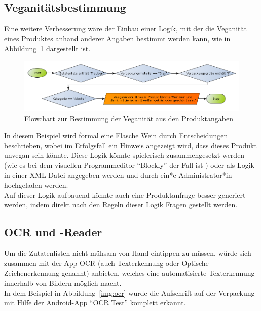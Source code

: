 \subsection{Veganitätsbestimmung}
\label{sec:future_work:veganity}

Eine weitere Verbesserung wäre der Einbau einer Logik, mit der die
Veganität eines Produktes anhand anderer Angaben bestimmt werden
kann, wie in Abbildung~\ref{img:veganity_logic} dargestellt ist.

\begin{figure}[ht]
	\begin{adjustwidth}{-1in}{-1in}
	\centering
	\includegraphics[scale=0.5]{misc/veganity_logic.png}
	\caption{Flowchart zur Bestimmung der Veganität aus
	den Produktangaben}
	\label{img:veganity_logic}
	\end{adjustwidth}
\end{figure}

In diesem Beispiel wird formal eine Flasche Wein durch Entscheidungen
beschrieben, wobei im Erfolgsfall ein Hinweis angezeigt wird, dass
dieses Produkt unvegan sein könnte.
Diese Logik könnte spielerisch zusammengesetzt werden (wie es bei dem
visuellen Programmeditor "`Blockly"' der Fall ist )
oder als Logik in einer XML-Datei angegeben werden und
durch ein*e Administrator*in hochgeladen werden.\\
Auf dieser Logik aufbauend könnte auch eine Produktanfrage besser
generiert werden, indem direkt nach den Regeln dieser Logik Fragen
gestellt werden.

\subsection{OCR und -Reader}
\label{sec:future_work:ocr}

Um die Zutatenlisten nicht mühsam von Hand eintippen zu müssen,
würde sich zusammen mit der App \ac{OCR} (auch Texterkennung oder Optische Zeichenerkennung
genannt) anbieten, welches eine automatisierte Texterkennung innerhalb von
Bildern möglich macht.\\
In dem Beispiel in Abbildung~\ref{img:ocr} wurde die Aufschrift auf
der Verpackung mit Hilfe der Android-App "`OCR Test"' komplett
erkannt.

